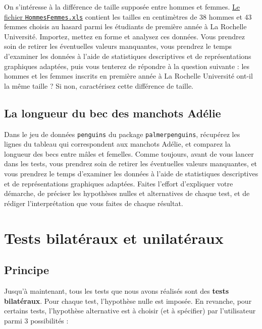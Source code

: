 \documentclass[
  a4paper,
  DIV=11,
  numbers=noendperiod,
  oneside]{scrreprt}
\begin{document}
On s'intéresse à la différence de taille supposée entre hommes et
femmes. \href{data/HommesFemmes.xls}{Le fichier
\texttt{HommesFemmes.xls}} contient les tailles en centimètres de 38
hommes et 43 femmes choisis au hasard parmi les étudiants de première
année à La Rochelle Université. Importez, mettez en forme et analysez
ces données. Vous prendrez soin de retirer les éventuelles valeurs
manquantes, vous prendrez le temps d'examiner les données à l'aide de
statistiques descriptives et de représentations graphiques adaptées,
puis vous tenterez de répondre à la question suivante : les hommes et
les femmes inscrits en première année à La Rochelle Université ont-il la
même taille ? Si non, caractérisez cette différence de taille.

\hypertarget{la-longueur-du-bec-des-manchots-aduxe9lie}{%
\subsection{La longueur du bec des manchots
Adélie}\label{la-longueur-du-bec-des-manchots-aduxe9lie}}

Dans le jeu de données \texttt{penguins} du package
\texttt{palmerpenguins}, récupérez les lignes du tableau qui
correspondent aux manchots Adélie, et comparez la longueur des becs
entre mâles et femelles. Comme toujours, avant de vous lancer dans les
tests, vous prendrez soin de retirer les éventuelles valeurs manquantes,
et vous prendrez le temps d'examiner les données à l'aide de
statistiques descriptives et de représentations graphiques adaptées.
Faites l'effort d'expliquer votre démarche, de préciser les hypothèses
nulles et alternatives de chaque test, et de rédiger l'interprétation
que vous faites de chaque résultat.

\hypertarget{sec-bilat}{%
\section{Tests bilatéraux et unilatéraux}\label{sec-bilat}}

\hypertarget{principe}{%
\subsection{Principe}\label{principe}}

Jusqu'à maintenant, tous les tests que nous avons réalisés sont des
\textbf{tests bilatéraux}. Pour chaque test, l'hypothèse nulle est
imposée. En revanche, pour certains tests, l'hypothèse alternative est à
choisir (et à spécifier) par l'utilisateur parmi 3 possibilités :
\end{document}
